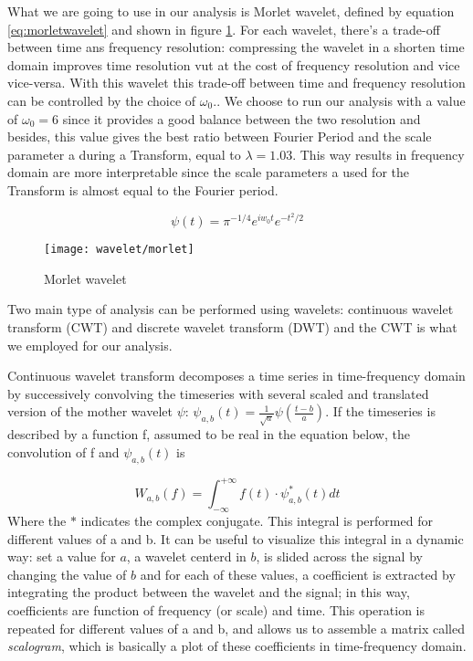 \documentclass[11pt]{report}
\begin{document}
What we are going to use in our analysis is Morlet wavelet, defined by equation \ref{eq:morletwavelet} and shown in figure \ref{fig:wavelet_morlet}.
For each wavelet, there's a trade-off between time ans frequency resolution: compressing the wavelet in a shorten time domain improves time resolution vut at the cost of frequency resolution and vice vice-versa.
With this wavelet this trade-off between time and frequency resolution can be controlled by the choice of $\omega_0$.\cite{muller-2004}.
We choose to run our analysis with a value of $\omega_0 = 6$ since it provides a good balance between the two resolution \cite{grinsted-2004} and besides, this value gives the best ratio between Fourier Period and the scale parameter a during a Transform, equal to $\lambda = 1.03$.
This way results in frequency domain are more interpretable since the scale parameters a used for the Transform is almost equal to the Fourier period.


\begin{equation}\label{eq:morletwavelet}
\psi\left(t\right) = \pi^{-1/4}e^{iw_0 t}e^{-t^2/2}
\end{equation}

\begin{figure}[h]
\centering
\texttt{[image: wavelet/morlet]}
\caption{Morlet wavelet}
\label{fig:wavelet_morlet}
\end{figure}

Two main type of analysis can be performed using wavelets: continuous wavelet transform (CWT) and discrete wavelet transform (DWT) and the CWT is what we employed for our analysis.

Continuous wavelet transform decomposes a time series in time-frequency domain by successively convolving the timeseries with several scaled and translated version of the mother wavelet $\psi$: $\psi_{a, b}\left(t\right) = \frac{1}{\sqrt{a}}\psi(\frac{t-b}{a})$.
If the timeseries is described by a function f, assumed to be real in the equation below, the convolution of f and $\psi_{a, b}\left(t\right)$ is

\begin{equation}
W_{a,b}(f) = \int_{-\infty}^{+\infty}  f(t) \cdot \psi_{a, b}^\ast \left(t\right)   dt
\end{equation}
Where the $\ast$ indicates the complex conjugate.
This integral is performed for different values of a and b.
It can be useful to visualize this integral in a dynamic way: set a value for $a$, a wavelet centerd in $b$, is slided across the signal by changing the value of $b$ and for each of these values, a coefficient is extracted by integrating the product between the wavelet and the signal; in this way, coefficients are function of frequency (or scale) and time. This operation is repeated for different values of a and b, and allows us to assemble a matrix called \emph{scalogram}, which is basically a plot of these coefficients in time-frequency domain.
\end{document}
